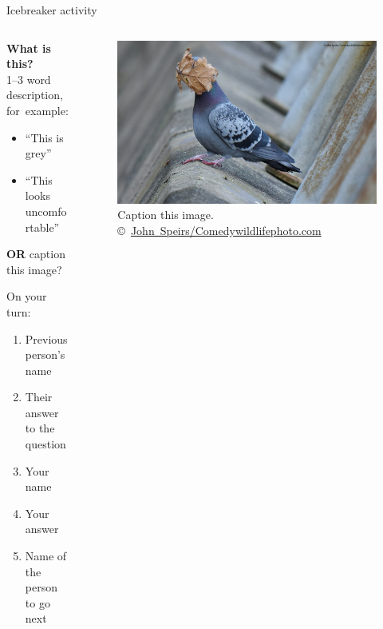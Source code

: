 \documentclass[
  11pt,
  ignorenonframetext,
]{beamer}
\providecommand{\tightlist}{%
  \setlength{\itemsep}{0pt}\setlength{\parskip}{0pt}}
\begin{document}
\begin{frame}{ Icebreaker activity}
\protect\hypertarget{icebreaker-activity}{}
\begin{columns}[T,onlytextwidth]
\begin{column}{0.48\textwidth}
\textbf{What is this?}\\
1--3 word description, for~example:

\begin{itemize}
\tightlist
\item
  ``This is grey''
\item
  ``This looks uncomfortable''
\end{itemize}

\textbf{OR} caption this image?

\hfill\break
On your turn:

\begin{enumerate}
\item
  Previous person's name
\item
  Their answer to the question
\item
  Your name
\item
  Your answer
\item
  Name of the person to go next
\end{enumerate}
\end{column}

\begin{column}{0.5\textwidth}
\begin{figure}
\centering
\includegraphics[width=1\textwidth,height=\textheight]{images/john-speirs_i-guess-summers-over.jpg}
\caption{Caption this image.\\
©~\href{https://www.comedywildlifephoto.com/gallery/comedy-wildlife-2021-competition-winners.php}{John~Speirs/\linebreak[0]Comedywildlifephoto.com}}
\end{figure}
\end{column}
\end{columns}
\end{frame}
\end{document}
